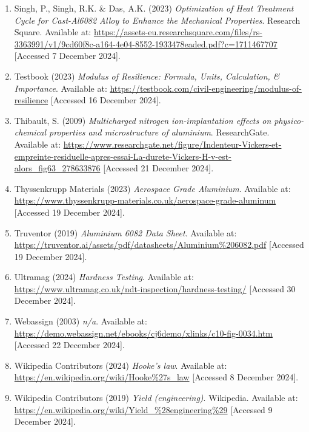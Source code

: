\documentclass{article}
\begin{document}
{\begin{enumerate}
    \item Singh, P., Singh, R.K. \& Das, A.K. (2023) \textit{Optimization of Heat Treatment Cycle for Cast-Al6082 Alloy to Enhance the Mechanical Properties}. Research Square. Available at: \url{https://assets-eu.researchsquare.com/files/rs-3363991/v1/9cd60f8c-a164-4e04-8552-1933478eaded.pdf?c=1711467707} [Accessed 7 December 2024].
    
    \item Testbook (2023) \textit{Modulus of Resilience: Formula, Units, Calculation, \& Importance}. Available at: \url{https://testbook.com/civil-engineering/modulus-of-resilience} [Accessed 16 December 2024].
    
    \item Thibault, S. (2009) \textit{Multicharged nitrogen ion-implantation effects on physico-chemical properties and microstructure of aluminium}. ResearchGate. Available at: \url{https://www.researchgate.net/figure/Indenteur-Vickers-et-empreinte-residuelle-apres-essai-La-durete-Vickers-H-v-est-alors_fig63_278633876} [Accessed 21 December 2024].
    
    \item Thyssenkrupp Materials (2023) \textit{Aerospace Grade Aluminium}. Available at: \url{https://www.thyssenkrupp-materials.co.uk/aerospace-grade-aluminum} [Accessed 19 December 2024].
    
    \item Truventor (2019) \textit{Aluminium 6082 Data Sheet}. Available at: \url{https://truventor.ai/assets/pdf/datasheets/Aluminium\%206082.pdf} [Accessed 19 December 2024].
    
    \item Ultramag (2024) \textit{Hardness Testing}. Available at: \url{https://www.ultramag.co.uk/ndt-inspection/hardness-testing/} [Accessed 30 December 2024].
    
    \item Webassign (2003) \textit{n/a}. Available at: \url{https://demo.webassign.net/ebooks/cj6demo/xlinks/c10-fig-0034.htm} [Accessed 22 December 2024].
    
    \item Wikipedia Contributors (2024) \textit{Hooke's law}. Available at: \url{https://en.wikipedia.org/wiki/Hooke\%27s_law} [Accessed 8 December 2024].
    
    \item Wikipedia Contributors (2019) \textit{Yield (engineering)}. Wikipedia. Available at: \url{https://en.wikipedia.org/wiki/Yield_\%28engineering\%29} [Accessed 9 December 2024].
    

\end{enumerate}}
\end{document}

